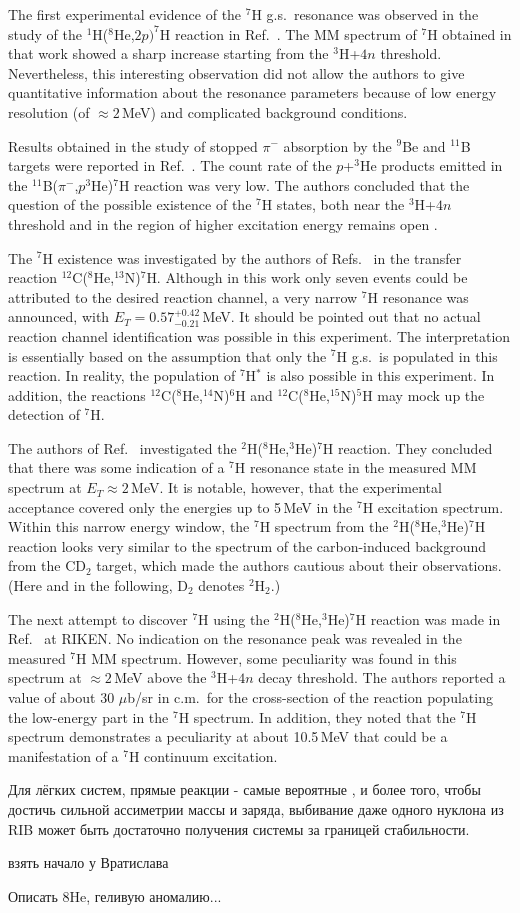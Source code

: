 The first experimental evidence of the $^{7}$H g.s.\ resonance was observed in the study of the $^1$H($^8$He,$2p)^7$H reaction in Ref.\  \cite{Korsheninnikov:2003}.
The MM spectrum of $^{7}$H obtained in that work showed a sharp increase starting from the $^3$H+$4n$ threshold.
Nevertheless, this interesting observation did not allow the authors to give quantitative information about the resonance parameters because of low energy resolution (of $\approx 2$\,MeV) and complicated background conditions.

Results obtained in the study of stopped $\pi^-$ absorption by the $^9$Be and $^{11}$B targets were reported in Ref.\ \cite{Gurov:2007}.
The count rate of the $p$+$^3$He products emitted in the $^{11}$B($\pi^-$,$p^3$He)$^7$H reaction was very low.
The authors concluded that the question of the possible existence of the $^{7}$H states, both near the $^3$H+$4n$ threshold and in the region of higher excitation energy remains open \cite{Gurov:2009}.

The $^{7}$H existence was investigated by the authors of Refs.\ \cite{Caamano:2007,Caamano:2008} in the transfer reaction $^{12}$C($^{8}$He,$^{13}$N)$^{7}$H.
Although in this work only seven events could be attributed to the desired reaction channel, a very narrow $^7$H resonance was announced, with $E_T= 0.57^{+0.42}_{-0.21}$\,MeV.
It should be pointed out that no actual reaction channel identification was possible in this experiment.
The interpretation is essentially based on the assumption that only the $^{7}$H g.s.\ is populated in this reaction.
In reality, the population of $^{7}$H$^*$ is also possible in this experiment.
In addition, the reactions $^{12}$C($^{8}$He,$^{14}$N)$^{6}$H and $^{12}$C($^{8}$He,$^{15}$N)$^{5}$H may mock up the detection of $^{7}$H.

The authors of Ref.\ \cite{Fortier:2007} investigated the $^2$H($^8$He,$^3$He)$^7$H reaction.
They concluded that there was some indication of a $^7$H resonance state in the measured MM spectrum at $E_T \approx 2$\,MeV.
It is notable, however, that the experimental acceptance covered only the energies up to 5\,MeV in the $^{7}$H excitation spectrum.
Within this narrow energy window, the $^{7}$H spectrum from the $^2$H($^8$He,$^3$He)$^7$H reaction looks very similar to the spectrum of the  carbon-induced background from the CD$_2$ target, which made the authors cautious about their observations. (Here and in the following, D$_2$ denotes
$^2$H$_2$.)

The next attempt to discover $^{7}$H  using the $^2$H($^8$He,$^3$He)$^7$H reaction was made in Ref.\ \cite{Nikolskii:2010} at RIKEN.
No indication on the resonance peak was revealed in the measured $^7$H MM spectrum.
However, some peculiarity was found in this spectrum at $\approx 2$\,MeV above the $^3$H+$4n$ decay threshold.
The authors reported a value of about 30 $\mu$b/sr in c.m.\ for the cross-section of the reaction populating the low-energy part in the $^7$H spectrum.
In addition, they noted that the $^7$H spectrum demonstrates a peculiarity at about 10.5\,MeV that could be a manifestation of a $^{7}$H continuum excitation.

Для лёгких систем, прямые реакции - самые вероятные , и более того, чтобы достичь сильной ассиметрии массы и заряда, выбивание даже одного нуклона из RIB может быть достаточно получения системы за границей стабильности.

взять начало у Вратислава

Описать 8He, геливую аномалию...